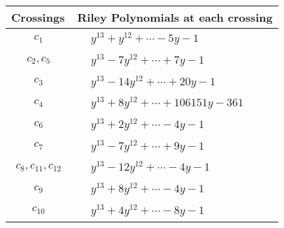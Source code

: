 \documentclass[1p]{elsarticle_modified}
\theoremstyle{definition}
\begin{document}
\begin{tabular}{m{50pt}|m{274pt}}
Crossings & \hspace{64pt}Riley Polynomials at each crossing \\
\hline $$\begin{aligned}c_{1}\end{aligned}$$&$\begin{aligned}
&y^{13}+y^{12}+\cdots-5 y-1
\end{aligned}$\\
\hline $$\begin{aligned}c_{2},c_{5}\end{aligned}$$&$\begin{aligned}
&y^{13}-7 y^{12}+\cdots+7 y-1
\end{aligned}$\\
\hline $$\begin{aligned}c_{3}\end{aligned}$$&$\begin{aligned}
&y^{13}-14 y^{12}+\cdots+20 y-1
\end{aligned}$\\
\hline $$\begin{aligned}c_{4}\end{aligned}$$&$\begin{aligned}
&y^{13}+8 y^{12}+\cdots+106151 y-361
\end{aligned}$\\
\hline $$\begin{aligned}c_{6}\end{aligned}$$&$\begin{aligned}
&y^{13}+2 y^{12}+\cdots-4 y-1
\end{aligned}$\\
\hline $$\begin{aligned}c_{7}\end{aligned}$$&$\begin{aligned}
&y^{13}-7 y^{12}+\cdots+9 y-1
\end{aligned}$\\
\hline $$\begin{aligned}c_{8},c_{11},c_{12}\end{aligned}$$&$\begin{aligned}
&y^{13}-12 y^{12}+\cdots-4 y-1
\end{aligned}$\\
\hline $$\begin{aligned}c_{9}\end{aligned}$$&$\begin{aligned}
&y^{13}+8 y^{12}+\cdots-4 y-1
\end{aligned}$\\
\hline $$\begin{aligned}c_{10}\end{aligned}$$&$\begin{aligned}
&y^{13}+4 y^{12}+\cdots-8 y-1
\end{aligned}$\\
\hline
\end{tabular}\\~\\
\end{document}
